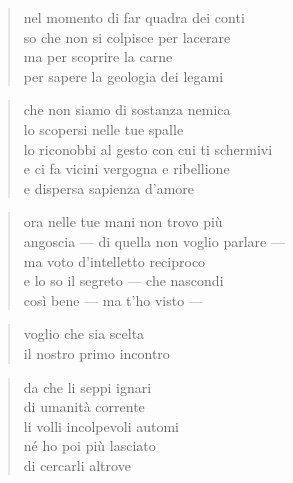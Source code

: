 	\begin{verse}
		nel momento di far quadra dei conti\\
		so che non si colpisce per lacerare\\
		ma per scoprire la carne\\
		per sapere la geologia dei legami
	\end{verse}

	\begin{verse}
		che non siamo di sostanza nemica\\
		lo scopersi nelle tue spalle\\
		lo riconobbi al gesto con cui ti schermivi\\
		e ci fa vicini vergogna e ribellione\\
		e dispersa sapienza d’amore
	\end{verse}

	\begin{verse}
		ora nelle tue mani non trovo più\\
		angoscia — di quella non voglio parlare —\\
		ma voto d’intelletto reciproco\\
		e lo so il segreto — che nascondi\\
		così bene — ma t'ho visto —
	\end{verse}

	\begin{verse}
		voglio che sia scelta\\
		il nostro primo incontro
	\end{verse}

\clearpage


	\begin{verse}
		da che li seppi ignari\\
		di umanità corrente\\
		li volli incolpevoli automi\\
		né ho poi più lasciato\\
		di cercarli altrove
	\end{verse}
